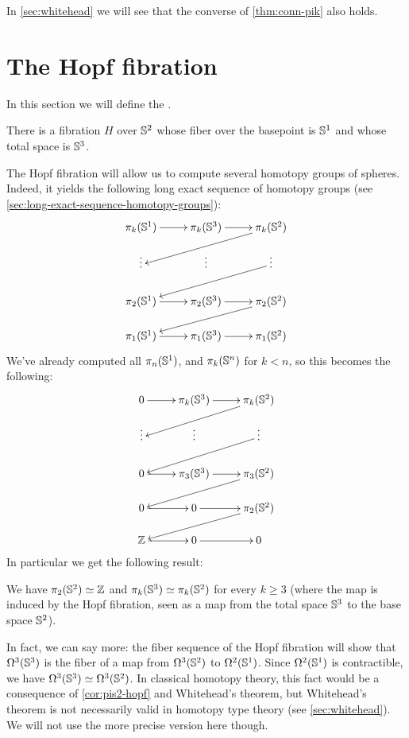 In \autoref{sec:whitehead} we will see that the converse of \autoref{thm:conn-pik} also holds.

%
%

\section{The Hopf fibration}
\label{sec:hopf}

In this section we will define the .
%

\begin{thm}\label{thm:hopf-fibration}
There is a fibration $H$ over $\mathbb{S} ^2$ whose fiber over the basepoint is $\mathbb{S} ^1$ and
whose total space is $\mathbb{S} ^3$.
\end{thm}

The Hopf fibration will allow us to compute several homotopy groups of
spheres.
Indeed, it yields the following long exact sequence
of homotopy groups
(see
\autoref{sec:long-exact-sequence-homotopy-groups}):
%
\[
\xymatrix@R=1.2pc{
  \pi_k(\Sn^1) \ar[r] & \pi_k(\Sn^3) \ar[r] & \pi_k(\Sn^2) \ar[lld] \\
  \vdots & \vdots & \vdots \ar[lld] \\
  \pi_2(\Sn^1) \ar[r] & \pi_2(\Sn^3) \ar[r] & \pi_2(\Sn^2) \ar[lld] \\
  \pi_1(\Sn^1) \ar[r] & \pi_1(\Sn^3) \ar[r] & \pi_1(\Sn^2)}
\]
%
We've already computed all $\pi_n(\mathbb{S}^1)$, and $\pi_k(\mathbb{S}^n)$ for $k<n$, so this
becomes the following:
%
\[
\xymatrix@R=1.2pc{
  0 \ar[r] & \pi_k(\Sn^3) \ar[r] & \pi_k(\Sn^2) \ar[lld] \\
  \vdots & \vdots & \vdots \ar[lld] \\
  0 \ar[r] & \pi_3(\Sn^3) \ar[r] & \pi_3(\Sn^2) \ar[lld] \\
  0 \ar[r] & 0 \ar[r] & \pi_2(\Sn^2) \ar[lld] \\
  \Z \ar[r] & 0 \ar[r] & 0}
\]
%
In particular we get the following result:

\begin{cor} \label{cor:pis2-hopf}
  We have $\pi_2(\mathbb{S}^2) \simeq \mathbb{Z}$ and $\pi_k(\mathbb{S}^3) \simeq \pi_k(\mathbb{S}^2)$ for
  every $k\ge3$ (where the map is induced by the Hopf fibration, seen as a map
  from the total space $\mathbb{S}^3$ to the base space $\mathbb{S}^2$).
\end{cor}

In fact, we can say more: the fiber sequence of the Hopf fibration will show that $\Omega^3(\mathbb{S}^3)$ is the fiber of a map from $\Omega^3(\mathbb{S}^2)$ to $\Omega^2(\mathbb{S}^1)$.
Since $\Omega^2(\mathbb{S}^1)$ is contractible, we have $\Omega^3(\mathbb{S}^3) \simeq \Omega^3(\mathbb{S}^2)$.
In classical homotopy theory, this fact would be a consequence of \autoref{cor:pis2-hopf} and Whitehead's theorem, but Whitehead's theorem is not necessarily valid in homotopy type theory (see \autoref{sec:whitehead}).
We will not use the more precise version here though.

